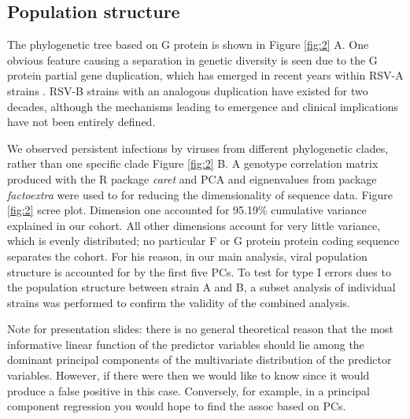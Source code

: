 \documentclass{article}
\begin{document}
\subsection{Population structure}
The phylogenetic tree based on G protein is shown in 
Figure \ref{fig:2} A.
One obvious feature causing a separation in genetic diversity is seen due to the G protein partial gene duplication, 
which has emerged in recent years within RSV-A strains 
\cite{eshaghi2012genetic}.
RSV-B strains with an analogous duplication have existed for two decades, 
although the mechanisms leading to emergence and clinical implications have not been entirely defined.

We observed persistent infections by viruses from different phylogenetic clades, rather than one specific clade 
Figure \ref{fig:2} B.
A genotype correlation matrix produced with the R package \textit{caret} and PCA and eignenvalues from package \textit{factoextra} were used to for reducing the dimensionality of sequence data.
Figure \ref{fig:2} scree plot.
Dimension one accounted for 95.19\% cumulative variance explained in our cohort.
All other dimensions account for very little variance, which is evenly distributed; no particular F or G protein protein coding sequence separates the cohort.
For his reason, in our main analysis, viral population structure is accounted for by the first five PCs. 
To test for type I errors dues to the population structure between strain A and B, 
a subset analysis of individual strains was performed to confirm the validity of the combined analysis.

Note for presentation slides: there is no general theoretical reason that the most informative linear function of the predictor variables should lie among the dominant principal components of the multivariate distribution of the predictor variables. However, if there were then we would like to know since it would produce a false positive in this case. Conversely, for example, in a principal component regression you would hope to find the assoc based on PCs.
\end{document}
